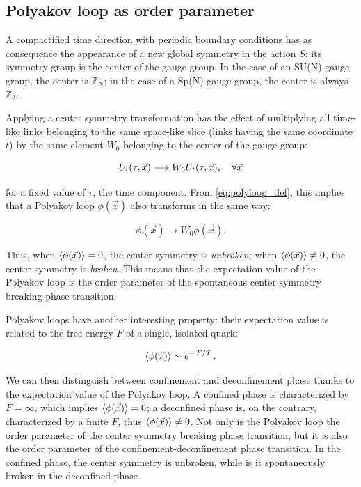 \documentclass[reqno,12pt]{article}
\numberwithin{equation}{section}
\begin{document}
\subsection{Polyakov loop as order parameter}

A compactified time direction with periodic boundary conditions has as consequence the appearance of a new
global symmetry in the action $S$: its symmetry group is the center of the gauge group. In the case of an SU(N) gauge
group, the center is $\mathbb{Z}_N$; in the case of a Sp(N) gauge group, the center is always $\mathbb{Z}_2$.

Applying a center symmetry transformation has the effect of multiplying all time-like links belonging to the same space-like slice (links having
the same coordinate $t$) by the same element $W_0$ belonging to the center of the gauge group:

\begin{equation}
	U_t(\tau, \vec{x}) \longrightarrow W_0 U_t(\tau, \vec{x}) \qc \forall \vec{x}
\end{equation}

for a fixed value of $\tau$, the time component. From \eqref{eq:polyloop_def}, this implies that a Polyakov loop $\phi(\vec{x})$ also 
transforms in the same way:

\begin{equation}
	\phi(\vec{x}) \longrightarrow W_0 \phi(\vec{x}).
\end{equation}

Thus, when $\expval{\phi(\vec{x})} = 0$, the center symmetry is \textit{unbroken}; when $\expval{\phi(\vec{x})} \neq 0$, the center symmetry
is \textit{broken}. This means that the expectation value of the Polyakov loop is the order parameter of the spontaneous center symmetry
breaking phase transition.

Polyakov loops have another interesting property: their expectation value is related to the free energy $F$ of a single, isolated quark:

\begin{equation}
	\expval{\phi(\vec{x})} \sim e^{-\flatfrac{F}{T}}.
\end{equation}

We can then distinguish between confinement and deconfinement phase thanks to the expectation value of the Polyakov loop. A confined
phase is characterized by $F = \infty$, which implies $\expval{\phi(\vec{x})} = 0$; a deconfined phase is, on the contrary, characterized
by a finite $F$, thus $\expval{\phi(\vec{x})} \neq 0$. Not only is the Polyakov loop the order parameter of the center symmetry breaking phase
transition, but it is also the order parameter of the confinement-deconfinement phase transition. In the confined phase, the center symmetry
is unbroken, while is it spontaneously broken in the deconfined phase. 
\end{document}
